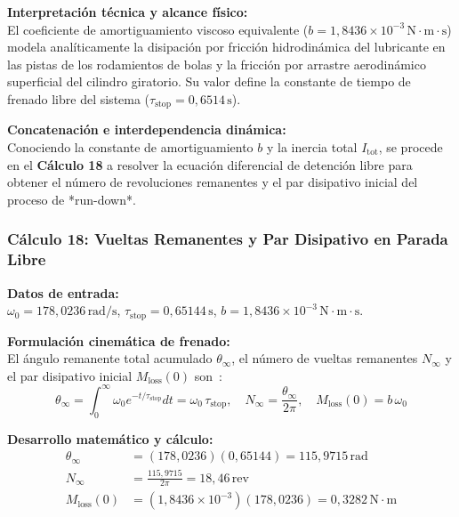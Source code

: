 \documentclass[12pt,a4paper]{article}
\begin{document}
\noindent\textbf{Interpretación técnica y alcance físico:}\\
El coeficiente de amortiguamiento viscoso equivalente ($b = 1{,}8436 \times 10^{-3}\,\text{N}\cdot\text{m}\cdot\text{s}$) modela analíticamente la disipación por fricción hidrodinámica del lubricante en las pistas de los rodamientos de bolas y la fricción por arrastre aerodinámico superficial del cilindro giratorio. Su valor define la constante de tiempo de frenado libre del sistema ($\tau_{\text{stop}} = 0{,}6514\,\text{s}$).

\noindent\textbf{Concatenación e interdependencia dinámica:}\\
Conociendo la constante de amortiguamiento $b$ y la inercia total $I_{\text{tot}}$, se procede en el \textbf{Cálculo 18} a resolver la ecuación diferencial de detención libre para obtener el número de revoluciones remanentes y el par disipativo inicial del proceso de *run-down*.
\vspace{12pt}

\subsubsection{Cálculo 18: Vueltas Remanentes y Par Disipativo en Parada Libre}

\noindent\textbf{Datos de entrada:}\\
$\omega_0 = 178{,}0236\,\text{rad/s}$, $\tau_{\text{stop}} = 0{,}65144\,\text{s}$, $b = 1{,}8436\times 10^{-3}\,\text{N}\cdot\text{m}\cdot\text{s}$.
\vspace{6pt}

\noindent\textbf{Formulación cinemática de frenado:}\\
El ángulo remanente total acumulado $\theta_\infty$, el número de vueltas remanentes $N_\infty$ y el par disipativo inicial $M_{\text{loss}}(0)$ son~\cite{urinov2024}:
\begin{equation}
    \theta_\infty = \int_0^\infty \omega_0 e^{-t/\tau_{\text{stop}}} dt = \omega_0 \, \tau_{\text{stop}}, \quad N_\infty = \frac{\theta_\infty}{2\pi}, \quad M_{\text{loss}}(0) = b\,\omega_0
\end{equation}
\vspace{6pt}

\noindent\textbf{Desarrollo matemático y cálculo:}
\begin{align}
    \theta_\infty &= (178{,}0236)(0{,}65144) = \boxed{115{,}9715\,\text{rad}} \\[6pt]
    N_\infty &= \frac{115{,}9715}{2\pi} = \boxed{18{,}46\,\text{rev}} \\[6pt]
    M_{\text{loss}}(0) &= (1{,}8436 \times 10^{-3})(178{,}0236) = \boxed{0{,}3282\,\text{N}\cdot\text{m}}
\end{align}
\vspace{6pt}
\end{document}

